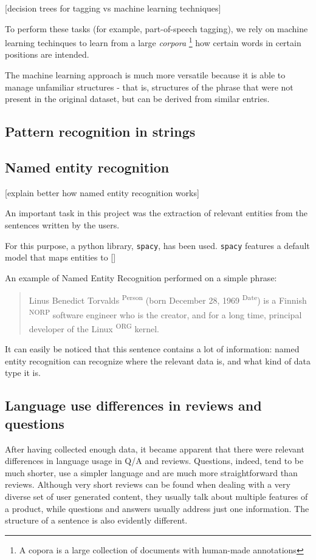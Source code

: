 \documentclass[LaM,binding=0.6cm]{sapthesis}
\begin{document}
[decision trees for tagging vs machine learning techniques]

To perform these tasks (for example, part-of-speech tagging), we rely on machine learning techinques to learn from a large \textit{corpora} \footnote{A copora is a large collection of documents with human-made annotations} how certain words in certain positions are intended.

The machine learning approach is much more versatile because it is able to manage unfamiliar structures - that is, structures of the phrase that were not present in the original dataset, but can be derived from similar entries.

\subsection{Pattern recognition in strings}

\subsection{Named entity recognition}

[explain better how named entity recognition works]

An important task in this project was the extraction of relevant entities from the sentences written by the users.

For this purpose, a python library, \texttt{spacy}, has been used. \texttt{spacy} features a default model that maps entities to []

An example of Named Entity Recognition performed on a simple phrase:
\begin{quote}
Linus Benedict Torvalds \textsuperscript{Person} (born December 28, 1969 \textsuperscript{Date}) is a Finnish \textsuperscript{NORP} software engineer who is the creator, and for a long time, principal developer of the Linux \textsuperscript{ORG} kernel.
\end{quote}

It can easily be noticed that this sentence contains a lot of information: named entity recognition can recognize where the relevant data is, and what kind of data type it is.

\subsection{Language use differences in reviews and questions}

After having collected enough data, it became apparent that there were relevant differences in language usage in Q/A and reviews. Questions, indeed, tend to be much shorter, use a simpler language and are much more straightforward than reviews. Although very short reviews can be found when dealing with a very diverse set of user generated content, they usually talk about multiple features of a product, while questions and answers usually address just one information. The structure of a sentence is also evidently different.
\end{document}

